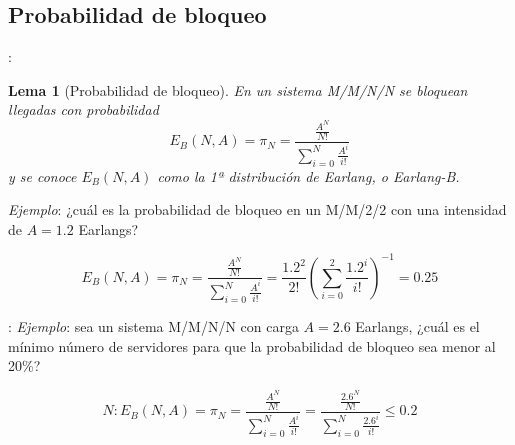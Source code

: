 \documentclass[xcolor={x11names}]{beamer}
\newtheorem{lema}{Lema}[section]
\begin{document}
\subsection{Probabilidad de bloqueo}
\begin{frame}{\secname: \subsecname}
    \begin{lema}[Probabilidad de bloqueo]
        En un sistema M/M/N/N se bloquean
        llegadas con probabilidad
        \begin{equation}
            E_B(N,A)=\pi_N=
            \frac{\frac{A^N}{N!}}{\sum_{i=0}^N\frac{A^i}{i!}}
        \end{equation}
        y se conoce $E_B(N,A)$
        como la 1ª distribución
        de Earlang, o Earlang-B.
    \end{lema}

    \vfill

    \textit{Ejemplo}: ¿cuál es la probabilidad
    de bloqueo en un M/M/2/2 con una
    intensidad de $A=1.2$ Earlangs?
    \begin{figure}
        \resizebox{!}{.1\textwidth}{%
            
        }
    \end{figure}
    \begin{equation*}
        E_B(N,A)=\pi_N=
        \frac{\frac{A^N}{N!}}{\sum_{i=0}^N\frac{A^i}{i!}}
        =\frac{1.2^2}{2!}\left(
            \sum_{i=0}^2 \frac{1.2^i}{i!}
        \right)^{-1}
        = 0.25
    \end{equation*}
\end{frame}




\begin{frame}{\secname: \subsecname}
    \textit{Ejemplo}: sea un sistema
    M/M/N/N con carga $A=2.6$ Earlangs,
    ¿cuál es el mínimo
    número de servidores para que
    la probabilidad de bloqueo sea
    menor al 20\%?

    \begin{equation*}
        N: E_B(N,A)=\pi_N
        =\frac{\frac{A^N}{N!}}{\sum_{i=0}^N\frac{A^i}{i!}}
        =\frac{\frac{2.6^N}{N!}}{\sum_{i=0}^N\frac{2.6^i}{i!}}\leq 0.2
    \end{equation*}

    \begin{figure}
        
    \end{figure}
\end{frame}
\end{document}
